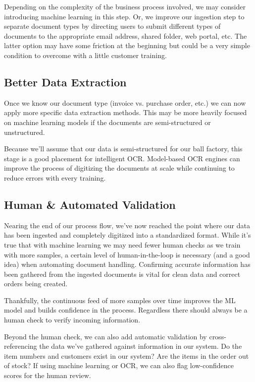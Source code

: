 \documentclass[conference, draftcls]{IEEEtran}
\begin{document}
Depending on the complexity of the business process involved, we may consider introducing machine learning in this step. Or, we improve our ingestion step to separate document types by directing users to submit different types of documents to the appropriate email address, shared folder, web portal, etc. The latter option may have some friction at the beginning but could be a very simple condition to overcome with a little customer training.

\subsection{Better Data Extraction}
Once we know our document type (invoice vs. purchase order, etc.) we can now apply more specific data extraction methods. This may be more heavily focused on machine learning models if the documents are semi-structured or unstructured.

Because we'll assume that our data is semi-structured for our ball factory, this stage is a good placement for intelligent OCR. Model-based OCR engines can improve the process of digitizing the documents at scale while continuing to reduce errors with every training.

\subsection{Human \& Automated Validation}
Nearing the end of our process flow, we've now reached the point where our data has been ingested and completely digitized into a standardized format. While it's true that with machine learning we may need fewer human checks as we train with more samples, a certain level of human-in-the-loop is necessary (and a good idea) when automating document handling. Confirming accurate information has been gathered from the ingested documents is vital for clean data and correct orders being created.

Thankfully, the continuous feed of more samples over time improves the ML model and builds confidence in the process. Regardless there should always be a human check to verify incoming information.

Beyond the human check, we can also add automatic validation by cross-referencing the data we've gathered against information in our system. Do the item numbers and customers exist in our system? Are the items in the order out of stock? If using machine learning or OCR, we can also flag low-confidence scores for the human review.
\end{document}
